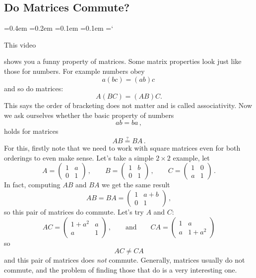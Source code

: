 
\subsection*{Do Matrices Commute?}

{\ttfamily
{}\font=0.4em
\font=0.2em
\font=0.1em
\font=0.1em
\hyphenchar\font=`\-

\hypertarget{script_matrices_commute}{This video} shows you a funny property of matrices.
Some matrix properties look just like those for numbers. For example numbers obey
\[
a(bc) = (ab)c\, 
\]
and so do matrices:
\[
A(BC)=(AB)C.
\]
This says the order of bracketing does not matter and is called associativity.
Now we ask ourselves whether the basic property of numbers
\[ab=ba\, ,\]
holds for matrices
\[AB\stackrel?=BA\, .\]
For this, firstly note that we need to work with square matrices even for both orderings to even make sense.
Let's take a simple $2\times 2$ example, let
\[
A=\begin{pmatrix}1&a\\0&1\end{pmatrix}\, ,\qquad
B=\begin{pmatrix}1&b\\0&1\end{pmatrix}\, ,\qquad
C=\begin{pmatrix}1&0\\a&1\end{pmatrix}\, .
\]
In fact, computing $AB$ and $BA$ we get the same result
\[AB=BA=\begin{pmatrix}1&a+b\\0&1\end{pmatrix}\, ,\]
so this pair of matrices do commute. Let's try $A$ and $C$:
\[
AC=\begin{pmatrix}1+a^2&a\\a&1\end{pmatrix}\, ,\qquad\mbox{and}\qquad CA =\begin{pmatrix}1&a\\a&1+a^2\end{pmatrix}
\]
so \[AC\neq CA\]
and this pair of matrices does {\itshape not} commute. Generally, matrices usually do not commute, and the problem of finding those that do is a very interesting one.

} %

